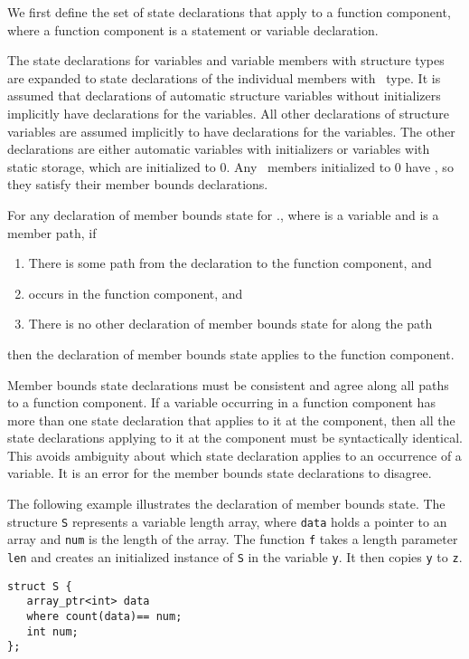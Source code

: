 We first define the set of state declarations that apply to a function
component, where a function component is a statement or
variable declaration.

The state declarations for variables and variable members with structure
types are expanded to state declarations of the individual members with
\arrayptr\ type. It is assumed that declarations of automatic
structure variables without initializers implicitly have 
declarations for the variables. All other declarations of structure
variables are assumed implicitly to have  declarations for the
variables. The other declarations are either automatic variables with
initializers or variables with static storage, which are initialized to
0. Any \arrayptr\ members initialized to 0 have \boundsany, so
they satisfy their member bounds declarations.

For any declaration of member bounds state for ., where
 is a variable and  is a member path, if
\begin{enumerate}
\item
  There is some path from the declaration to the function component, and
\item
   occurs in the function component, and
\item
  There is no other declaration of member bounds state for 
  along the path
\end{enumerate}
then the declaration of member bounds state applies to the function
component.

Member bounds state declarations must be consistent and agree
along all paths to a function component.   If a variable occurring in a
function component has more than one state declaration that applies to
it at the component, then all the state declarations applying to it at
the component must be syntactically identical. This avoids ambiguity
about which state declaration applies to an occurrence of a variable.
It is an error for the member bounds state declarations to disagree.

The following example illustrates the declaration of member bounds
state. The structure \texttt{S} represents a variable length array,
where \texttt{data} holds a pointer to an array and \texttt{num} is the 
length of the array. The function \texttt{f} takes a length parameter  
\texttt{len} and creates an initialized instance of \texttt{S} in the 
variable \texttt{y}.  It then copies \texttt{y} to \texttt{z}.

\begin{lstlisting}
struct S {
   array_ptr<int> data
   where count(data)== num;
   int num;
};
\end{lstlisting}

